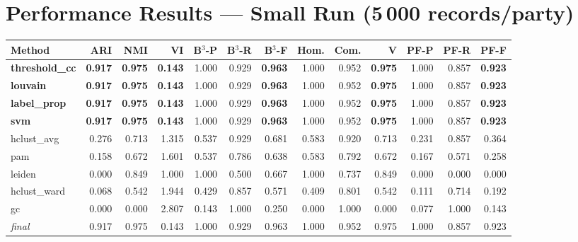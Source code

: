 \documentclass[11pt, a4paper]{article}
\begin{document}
\section{Performance Results --- Small Run (5\,000 records/party)}

\begin{table}[h!]
\centering
\small
\setlength{\tabcolsep}{4pt}
\begin{tabular}{lrrrrrrrrrrrr}
\toprule
\textbf{Method} & \textbf{ARI} & \textbf{NMI} & \textbf{VI} &
\textbf{B$^3$-P} & \textbf{B$^3$-R} & \textbf{B$^3$-F} &
\textbf{Hom.} & \textbf{Com.} & \textbf{V} &
\textbf{PF-P} & \textbf{PF-R} & \textbf{PF-F} \\
\midrule
\textbf{threshold\_cc} & \textbf{0.917} & \textbf{0.975} & \textbf{0.143} & 1.000 & 0.929 & \textbf{0.963} & 1.000 & 0.952 & \textbf{0.975} & 1.000 & 0.857 & \textbf{0.923} \\
\textbf{louvain}       & \textbf{0.917} & \textbf{0.975} & \textbf{0.143} & 1.000 & 0.929 & \textbf{0.963} & 1.000 & 0.952 & \textbf{0.975} & 1.000 & 0.857 & \textbf{0.923} \\
\textbf{label\_prop}   & \textbf{0.917} & \textbf{0.975} & \textbf{0.143} & 1.000 & 0.929 & \textbf{0.963} & 1.000 & 0.952 & \textbf{0.975} & 1.000 & 0.857 & \textbf{0.923} \\
\textbf{svm}           & \textbf{0.917} & \textbf{0.975} & \textbf{0.143} & 1.000 & 0.929 & \textbf{0.963} & 1.000 & 0.952 & \textbf{0.975} & 1.000 & 0.857 & \textbf{0.923} \\
hclust\_avg            & 0.276 & 0.713 & 1.315 & 0.537 & 0.929 & 0.681 & 0.583 & 0.920 & 0.713 & 0.231 & 0.857 & 0.364 \\
pam                    & 0.158 & 0.672 & 1.601 & 0.537 & 0.786 & 0.638 & 0.583 & 0.792 & 0.672 & 0.167 & 0.571 & 0.258 \\
leiden                 & 0.000 & 0.849 & 1.000 & 1.000 & 0.500 & 0.667 & 1.000 & 0.737 & 0.849 & 0.000 & 0.000 & 0.000 \\
hclust\_ward           & 0.068 & 0.542 & 1.944 & 0.429 & 0.857 & 0.571 & 0.409 & 0.801 & 0.542 & 0.111 & 0.714 & 0.192 \\
gc                     & 0.000 & 0.000 & 2.807 & 0.143 & 1.000 & 0.250 & 0.000 & 1.000 & 0.000 & 0.077 & 1.000 & 0.143 \\
\midrule
\textit{final}         & 0.917 & 0.975 & 0.143 & 1.000 & 0.929 & 0.963 & 1.000 & 0.952 & 0.975 & 1.000 & 0.857 & 0.923 \\
\bottomrule
\end{tabular}
\end{table}
\end{document}
